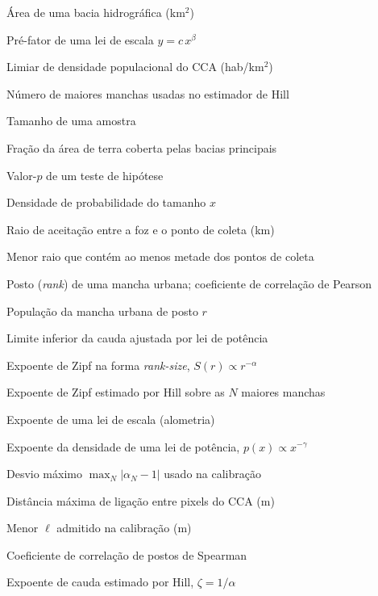 
\begin{simbolos} \itemsep -1pt
	\item[$ A $] Área de uma bacia hidrográfica (km$^2$)
	\item[$ c $] Pré-fator de uma lei de escala $y = c\,x^{\beta}$
	\item[$ D^{*} $] Limiar de densidade populacional do CCA (hab/km$^2$)
	\item[$ N $] Número de maiores manchas usadas no estimador de Hill
	\item[$ n $] Tamanho de uma amostra
	\item[$ P $] Fração da área de terra coberta pelas bacias principais
	\item[$ p $] Valor-$p$ de um teste de hipótese
	\item[$ p(x) $] Densidade de probabilidade do tamanho $x$
	\item[$ R $] Raio de aceitação entre a foz e o ponto de coleta (km)
	\item[$ R_{\mathrm{maioria}} $] Menor raio que contém ao menos metade dos pontos de coleta
	\item[$ r $] Posto (\textit{rank}) de uma mancha urbana; coeficiente de correlação de Pearson
	\item[$ S(r) $] População da mancha urbana de posto $r$
	\item[$ x_{\min} $] Limite inferior da cauda ajustada por lei de potência
	\item[$ \alpha $] Expoente de Zipf na forma \textit{rank-size}, $S(r) \propto r^{-\alpha}$
	\item[$ \alpha_N $] Expoente de Zipf estimado por Hill sobre as $N$ maiores manchas
	\item[$ \beta $] Expoente de uma lei de escala (alometria)
	\item[$ \gamma $] Expoente da densidade de uma lei de potência, $p(x) \propto x^{-\gamma}$
	\item[$ \Delta $] Desvio máximo $\max_N |\alpha_N - 1|$ usado na calibração
	\item[$ \ell $] Distância máxima de ligação entre pixels do CCA (m)
	\item[$ \ell_{\min} $] Menor $\ell$ admitido na calibração (m)
	\item[$ \rho_s $] Coeficiente de correlação de postos de Spearman
	\item[$ \zeta $] Expoente de cauda estimado por Hill, $\zeta = 1/\alpha$
\end{simbolos}
